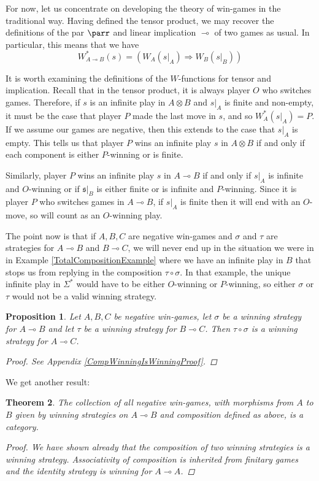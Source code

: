 \documentclass[11pt]{article} %
\theoremstyle{plain} %
\newtheorem{theorem}{Theorem}[section]
\newtheorem{proposition}[theorem]{Proposition}
\theoremstyle{definition} %
\theoremstyle{note}
\theoremstyle{exercisestyle}
\newcommand{\tensor}{\otimes}
\renewcommand{\implies}{\multimap}
\newcommand{\comp}[2]{#1 \circ #2}
\newcommand{\s}{\mathfrak s}
\newcommand{\st}{{\Sigma^*}}
\begin{document}
For now, let us concentrate on developing the theory of win-games in the traditional way.  Having defined the tensor product, we may recover the definitions of the par $\parr$ and linear implication $\implies$ of two games as usual.  In particular, this means that we have
\[
  W_{A\implies B}^*(s) = (W_A(s\vert_A) \Rightarrow W_B(s\vert_B))
  \]

It is worth examining the definitions of the $W$-functions for tensor and implication.  Recall that in the tensor product, it is always player $O$ who switches games.  Therefore, if $s$ is an infinite play in $A\tensor B$ and $s\vert_A$ is finite and non-empty, it must be the case that player $P$ made the last move in $s$, and so $W_A^*(s\vert_A)=P$.  If we assume our games are negative, then this extends to the case that $s\vert_A$ is empty.  This tells us that player $P$ wins an infinite play $s$ in $A\tensor B$ if and only if each component is either $P$-winning or is finite.  

Similarly, player $P$ wins an infinite play $s$ in $A\implies B$ if and only if $s\vert_A$ is infinite and $O$-winning or if $\s\vert_B$ is either finite or is infinite and $P$-winning.  Since it is player $P$ who switches games in $A\implies B$, if $s\vert_A$ is finite then it will end with an $O$-move, so will count as an $O$-winning play.  

The point now is that if $A,B,C$ are negative win-games and $\sigma$ and $\tau$ are strategies for $A\implies B$ and $B\implies C$, we will never end up in the situation we were in in Example \ref{TotalCompositionExample} where we have an infinite play in $B$ that stops us from replying in the composition $\comp\tau\sigma$.  In that example, the unique infinite play in $\st$ would have to be either $O$-winning or $P$-winning, so either $\sigma$ or $\tau$ would not be a valid winning strategy.  

\begin{proposition}
  \label{CompWinningIsWinning}
  Let $A,B,C$ be negative win-games, let $\sigma$ be a winning strategy for $A\implies B$ and let $\tau$ be a winning strategy for $B\implies C$.  Then $\comp\tau\sigma$ is a winning strategy for $A\implies C$.  
  \begin{proof}
    See Appendix \ref{CompWinningIsWinningProof}.
  \end{proof}
\end{proposition}

We get another result:

\begin{theorem}
  The collection of all negative win-games, with morphisms from $A$ to $B$ given by winning strategies on $A\implies B$ and composition defined as above, is a category.
  \begin{proof}
    We have shown already that the composition of two winning strategies is a winning strategy.  Associativity of composition is inherited from finitary games and the identity strategy is winning for $A\implies A$.  
  \end{proof}
\end{theorem}
\end{document}

